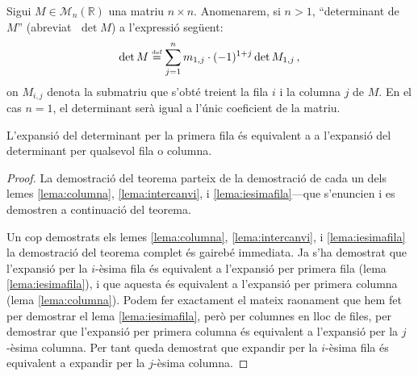 
\newcommand{\bl}{\color{blue}}
\newcommand{\rd}{\color{red}}
\newcommand{\gre}{\color{ForestGreen}}

\newcommand{\ucarr}{\mathbin{\text{\rotatebox[origin=c]{270}{$\curvearrowleft$}}}}
\newcommand{\dcarr}{\mathbin{\text{\rotatebox[origin=c]{270}{$\curvearrowright$}}}}

\begin{defi*}[Determinant]
	Sigui $M \in \mathcal{M}_n(\mathbb{R})$ una matriu $n\times n$. Anomenarem, si $n>1$, ``determinant de $M$'' (abreviat $\; \det M$) a l'expressió següent: \[\det M \stackrel{\text{\tiny def}}{=} \sum_{j=1}^{n} m_{1,j}\cdot(-1)^{1+j}\det M_{1,j}  \,,\] on $M_{i,j}$ denota la submatriu que s'obté treient la fila $i$ i la columna $j$ de $M$. En el cas $n=1$, el determinant serà igual a l'únic coeficient de la matriu.
\end{defi*}

\begin{specialteo}\label{teo:laplace}
	L'expansió del determinant per la primera fila és equivalent a a l'expansió del determinant per qualsevol fila o columna.

\vspace{5mm}

\begin{proof}
	La demostració del teorema parteix de la demostració de cada un dels lemes \ref{lema:columna}, \ref{lema:intercanvi}, i \ref{lema:iesimafila}---que s'enuncien i es demostren a continuació del teorema.
	
	Un cop demostrats els lemes \ref{lema:columna}, \ref{lema:intercanvi}, i \ref{lema:iesimafila} la demostració del teorema complet és gairebé immediata. Ja s'ha demostrat que l'expansió per la $i$-èsima fila és equivalent a l'expansió per primera fila (lema \ref{lema:iesimafila}), i que aquesta és equivalent a l'expansió per primera columna (lema \ref{lema:columna}). Podem fer exactament el mateix raonament que hem fet per demostrar el lema \ref{lema:iesimafila}, però per columnes en lloc de files, per demostrar que l'expansió per primera columna és equivalent a l'expansió per la $j$-èsima columna. Per tant queda demostrat que expandir per la $i$-èsima fila és equivalent a expandir per la $j$-èsima columna.
\end{proof}	


\end{specialteo}


